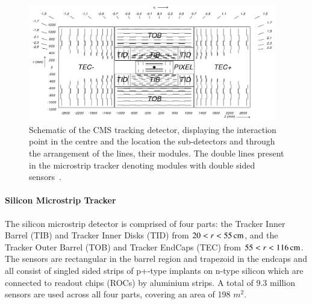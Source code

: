 \begin{figure}[htbp]
\begin{center}
\includegraphics[width=0.97\textwidth]{figs/cms/fig_cmstracker.png}
\caption{Schematic of the CMS tracking detector, displaying the interaction point in the centre and the location the sub-detectors and through the arrangement of the lines, their modules. The double lines present in the microstrip tracker denoting modules with double sided sensors~\cite{Sprenger:2010ss}.}
\label{fig:tracker}
\end{center}
\end{figure}

\paragraph{Silicon Microstrip Tracker}
The silicon microstrip detector is comprised of four parts: the Tracker Inner Barrel (TIB) and Tracker Inner Disks (TID) from $20 < r < 55\,\text{cm}$, and the Tracker Outer Barrel (TOB) and Tracker EndCaps (TEC) from $55 < r < 116\,\text{cm}$.
The sensors are rectangular in the barrel region and trapezoid in the endcaps and all consist of singled sided strips of p+-type implants on n-type silicon which are connected to readout chips (ROCs) by aluminium strips.
A total of 9.3 million sensors are used across all four parts, covering an area of 198 $\unit{m}^{2}$.


